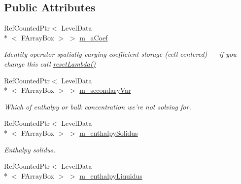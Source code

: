 \subsection*{Public Attributes}
\begin{DoxyCompactItemize}
\item 
\hypertarget{class_a_m_r_non_linear_multi_comp_op_af95d5785a1c0291dbd7309b1539ab2fb}{Ref\-Counted\-Ptr$<$ Level\-Data\\*
$<$ F\-Array\-Box $>$ $>$ \hyperlink{class_a_m_r_non_linear_multi_comp_op_af95d5785a1c0291dbd7309b1539ab2fb}{m\-\_\-a\-Coef}}\label{class_a_m_r_non_linear_multi_comp_op_af95d5785a1c0291dbd7309b1539ab2fb}

\begin{DoxyCompactList}\small\item\em Identity operator spatially varying coefficient storage (cell-\/centered) --- if you change this call \hyperlink{class_a_m_r_non_linear_multi_comp_op_aa558902d2bd88e41dff404c6b3ae206f}{reset\-Lambda()} \end{DoxyCompactList}\item 
\hypertarget{class_a_m_r_non_linear_multi_comp_op_a137649e6de11ed5ebf0fd06ed6766e65}{Ref\-Counted\-Ptr$<$ Level\-Data\\*
$<$ F\-Array\-Box $>$ $>$ \hyperlink{class_a_m_r_non_linear_multi_comp_op_a137649e6de11ed5ebf0fd06ed6766e65}{m\-\_\-secondary\-Var}}\label{class_a_m_r_non_linear_multi_comp_op_a137649e6de11ed5ebf0fd06ed6766e65}

\begin{DoxyCompactList}\small\item\em Which of enthalpy or bulk concentration we're not solving for. \end{DoxyCompactList}\item 
\hypertarget{class_a_m_r_non_linear_multi_comp_op_ad6cea304fd804cbf1c7340a9740ad955}{Ref\-Counted\-Ptr$<$ Level\-Data\\*
$<$ F\-Array\-Box $>$ $>$ \hyperlink{class_a_m_r_non_linear_multi_comp_op_ad6cea304fd804cbf1c7340a9740ad955}{m\-\_\-enthalpy\-Solidus}}\label{class_a_m_r_non_linear_multi_comp_op_ad6cea304fd804cbf1c7340a9740ad955}

\begin{DoxyCompactList}\small\item\em Enthalpy solidus. \end{DoxyCompactList}\item 
\hypertarget{class_a_m_r_non_linear_multi_comp_op_a285a99a0a4dcf36cd641f8c46d815873}{Ref\-Counted\-Ptr$<$ Level\-Data\\*
$<$ F\-Array\-Box $>$ $>$ \hyperlink{class_a_m_r_non_linear_multi_comp_op_a285a99a0a4dcf36cd641f8c46d815873}{m\-\_\-enthalpy\-Liquidus}}\label{class_a_m_r_non_linear_multi_comp_op_a285a99a0a4dcf36cd641f8c46d815873}


\end{DoxyCompactItemize}
